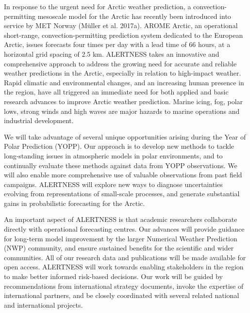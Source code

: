 \documentclass[a4paper,10pt]{article}
\begin{document}


In response to the urgent need for Arctic weather prediction, a convection-permitting mesoscale model for the Arctic has recently been introduced into service by MET Norway (Müller et al. 2017a). AROME Arctic, an operational short-range, convection-permitting prediction system dedicated to the European Arctic, issues forecasts four times per day with a lead time of 66 hours, at a horizontal grid spacing of 2.5 km. %
ALERTNESS takes an innovative and comprehensive approach to address the growing need for accurate and reliable weather predictions in the Arctic, especially in relation to high-impact weather. Rapid climatic and environmental changes, and an increasing human presence in the region, have all triggered an immediate need for both applied and basic research advances to improve Arctic weather prediction. Marine icing, fog, polar lows, strong winds and high waves are major hazards to marine operations and industrial development. 

We will take advantage of several unique opportunities arising during the Year of Polar Prediction (YOPP). Our approach is to develop new methods to tackle long-standing issues in atmospheric models in polar environments, and to continually evaluate these methods against data from YOPP observations. We will also enable more comprehensive use of valuable observations from past field campaigns. ALERTNESS will
explore new ways to diagnose uncertainties evolving from representations of small-scale processes, and generate substantial gains in probabilistic forecasting for the Arctic.

An important aspect of ALERTNESS is that academic researchers collaborate directly with operational forecasting centres. Our advances will provide guidance for long-term model improvement by the larger Numerical Weather Prediction (NWP) community, and ensure sustained benefits for the scientific and wider communities. All of our research data and publications will be made available for open access. ALERTNESS will work towards enabling stakeholders in the region to make better informed risk-based decisions. Our work will be guided by recommendations from international strategy documents, invoke the expertise of international partners, and be closely coordinated with several related national and international projects.
\end{document}
